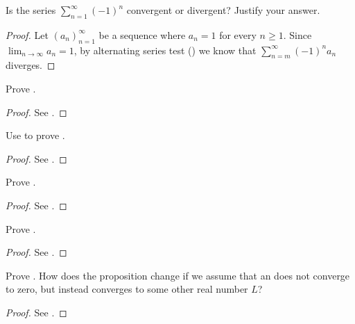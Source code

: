 \exercisesection

\begin{ex}\label{i:ex:7.2.1}
  Is the series \(\sum_{n = 1}^\infty (-1)^n\) convergent or divergent?
  Justify your answer.
\end{ex}

\begin{proof}
  Let \((a_n)_{n = 1}^\infty\) be a sequence where \(a_n = 1\) for every \(n \geq 1\).
  Since \(\lim_{n \to \infty} a_n = 1\), by alternating series test () we know that \(\sum_{n = m}^\infty (-1)^n a_n\) diverges.
\end{proof}

\begin{ex}\label{i:ex:7.2.2}
  Prove .
\end{ex}

\begin{proof}
  See .
\end{proof}

\begin{ex}\label{i:ex:7.2.3}
  Use  to prove .
\end{ex}

\begin{proof}
  See .
\end{proof}

\begin{ex}\label{i:ex:7.2.4}
  Prove .
\end{ex}

\begin{proof}
  See .
\end{proof}

\begin{ex}\label{i:ex:7.2.5}
  Prove .
\end{ex}

\begin{proof}
  See .
\end{proof}

\begin{ex}\label{i:ex:7.2.6}
  Prove .
  How does the proposition change if we assume that an does not converge to zero, but instead converges to some other real number \(L\)?
\end{ex}

\begin{proof}
  See .
\end{proof}
